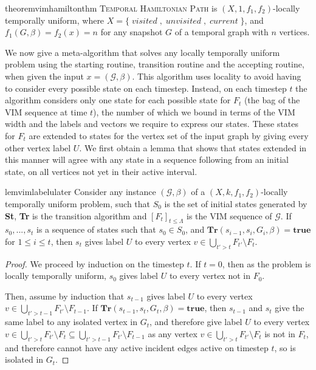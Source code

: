 \documentclass[a4paper,UKenglish,cleveref, autoref, thm-restate]{lipics-v2021} %
\DeclareMathOperator{\visited}{\textit{visited}}
\DeclareMathOperator{\unvisited}{\textit{unvisited}}
\DeclareMathOperator{\current}{\textit{current}}
\begin{document}
\begin{restatable}{theorem}{vimhamiltonthm}
    \textsc{Temporal Hamiltonian Path} is $(X,1,f_1,f_2)$-locally temporally uniform, where $X=\{\visited,\unvisited,\current\}$, and $f_1(G,\beta)=f_2(x)=n$ for any snapshot $G$ of a temporal graph with $n$ vertices.
\end{restatable}

\begin{toappendix}
We now give a meta-algorithm that solves any locally temporally uniform problem using the starting routine, transition routine and the accepting routine, when given the input $x = (\mathcal{G}, \beta)$. This algorithm uses locality to avoid having to consider every possible state on each timestep. Instead, on each timestep $t$ the algorithm considers only one state for each possible state for $F_t$ (the bag of the VIM sequence at time $t$), the number of which we bound in terms of the VIM width and the labels and vectors we require to express our states. These states for $F_t$ are extended to states for the vertex set of the input graph by giving every other vertex label $U$. We first obtain a lemma that shows that states extended in this manner will agree with any state in a sequence following from an initial state, on all vertices not yet in their active interval.

\begin{restatable}{lem}{vimlabelulater}\label{lem:labulater}
    Consider any instance $(\mathcal{G}, \beta)$ of a $(X,k,f_1,f_2)$-locally temporally uniform problem, such that $S_0$ is the set of initial states generated by \textbf{St}, \textbf{Tr} is the transition algorithm and $[F_t]_{t\leq\Lambda}$ is the VIM sequence of $\mathcal{G}$.  If $s_0, ..., s_t$ is a sequence of states such that $s_0 \in S_0$, and $\textbf{Tr}(s_{i-1}, s_i, G_i,\beta)=\textbf{true}$ for $1 \leq i \leq t$, then $s_t$ gives label $U$ to every vertex $v \in \bigcup_{t' > t}{F_{t'}} \setminus F_t$.
\end{restatable}
\begin{proof}
    We proceed by induction on the timestep $t$. If $t=0$, then as the problem is locally temporally uniform, $s_0$ gives label $U$ to every vertex not in $F_0$.
    
    Then, assume by induction that $s_{t-1}$ gives label $U$ to every vertex $v \in \bigcup_{t' > t-1}{F_{t'}} \setminus F_{t-1}$. If $\textbf{Tr}(s_{t-1}, s_t, G_t,\beta)=\textbf{true}$, then $s_{t-1}$ and $s_t$ give the same label to any isolated vertex in $G_t$, and therefore give label $U$ to every vertex $v \in \bigcup_{t' > t}{F_{t'}} \setminus F_{t} \subseteq \bigcup_{t' > t-1}{F_{t'}} \setminus F_{t-1}$ as any vertex $v \in \bigcup_{t' > t}{F_{t'}} \setminus F_t$ is not in $F_t$, and therefore cannot have any active incident edges active on timestep $t$, so is isolated in $G_t$. 
\end{proof}


\end{toappendix}
\end{document}
